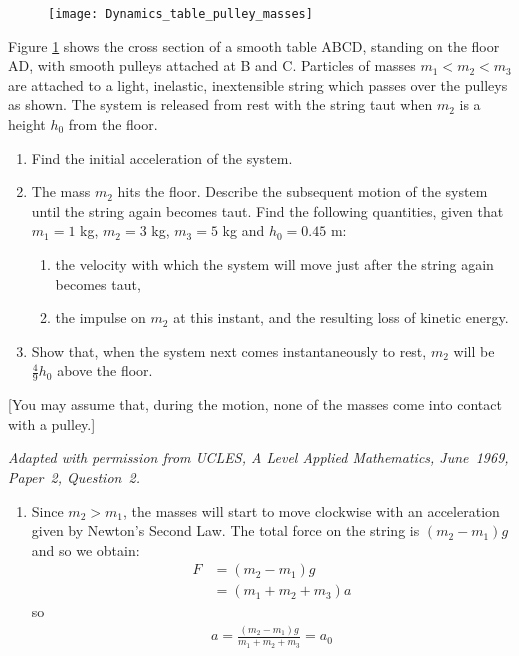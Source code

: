 
\begin{problem}[A1969AMIIQ2a] %
{\begin{figure}[h]
\centering
\texttt{[image: Dynamics\_table\_pulley\_masses]}
\caption{}\label{fig:Dynamics_table_pulley_masses}
\end{figure}

Figure \ref{fig:Dynamics_table_pulley_masses} shows the cross section of a smooth table ABCD, standing on the floor AD, with smooth pulleys attached at B and C. Particles of masses $m_{1} < m_{2} < m_{3}$ are attached to a light, inelastic, inextensible string which passes over the pulleys as shown. The system is released from rest with the string taut when $m_{2}$ is a height $h_{0}$ from the floor.
\begin{enumerate}
	\item Find the initial acceleration of the system.
	\item The mass $m_{2}$ hits the floor. Describe the subsequent motion of the system until the string again becomes taut. Find the following quantities, given that $m_{1} = 1$ kg, $m_{2} = 3$ kg, $m_{3} = 5$ kg and $h_{0} = 0.45$ m:
	\begin{enumerate}
		\item the velocity with which the system will move just after the string again becomes taut,
		\item the impulse on $m_{2}$ at this instant, and the resulting loss of kinetic energy.
	\end{enumerate}
	\item Show that, when the system next comes instantaneously to rest, $m_{2}$ will be $\frac{4}{9}h_{0}$ above the floor.
\end{enumerate}
[You may assume that, during the motion, none of the masses come into contact with a pulley.]
}
{\textit{Adapted with permission from UCLES, A Level Applied Mathematics, June~1969, Paper~2, Question~2.}}
{\begin{enumerate}
	\item Since $m_{2} > m_{1}$, the masses will start to move clockwise with an acceleration given by Newton's Second Law. The total force on the string is $(m_{2} - m_{1})g$ and so we obtain:
	\begin{align*} F &= (m_{2} - m_{1})g\\ &= (m_{1} + m_{2} + m_{3})a \end{align*} so \begin{align*} a = \frac{(m_{2} - m_{1})g}{m_{1} + m_{2} + m_{3}} = a_{0} \end{align*}

\end{enumerate}}
\end{problem}
